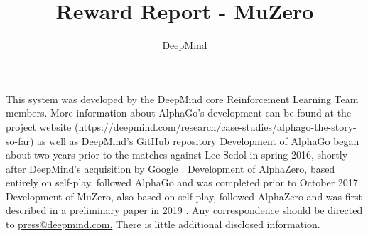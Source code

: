 \documentclass[12pt, a4paper, twocolumn]{article}
\title{Reward Report - MuZero}
\author{DeepMind}
\begin{document}
\SystemDetails
{This system was developed by the DeepMind
core Reinforcement Learning Team members.
More information about AlphaGo's development can be found at the project website (https://deepmind.com/research/case-studies/alphago-the-story-so-far) as well as DeepMind's GitHub repository}
{Development of AlphaGo began about two years prior to the matches against Lee Sedol in spring 2016, shortly after DeepMind's acquisition by Google \cite{pcworld}.
Development of AlphaZero, based entirely on self-play, followed AlphaGo and was completed prior to October 2017.
Development of MuZero, also based on self-play, followed AlphaZero and was first described in a preliminary paper in 2019 \cite{schrittwieser2020mastering}. }
{Any correspondence should be directed to
\url{press@deepmind.com.}}
{There is little additional disclosed information.}
\end{document}
